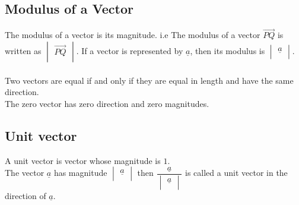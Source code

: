 \documentclass[11pt,a4paper]{article}
\begin{document}
\subsection{Modulus of a Vector}
The modulus of a vector is its magnitude. i.e The modulus of a  vector $\overrightarrow{PQ}$ is written as $\begin{vmatrix}
\overrightarrow{PQ}\\
\end{vmatrix}$. If a vector is represented by $\underline{a}$, then its modulus is $\begin{vmatrix}
\underline{a}\\
\end{vmatrix}$.\\\\



Two vectors are equal if and only if they are equal in length and have the same direction.\\

The zero vector has zero direction and zero magnitudes.

\begin{figure}[H]
\centering
{}
\end{figure}












\subsection{Unit vector}
A unit vector is vector whose magnitude is $1$.\\

The vector $\underline{a}$ has magnitude $\begin{vmatrix}
\underline{a}\\
\end{vmatrix}$ then $\dfrac{\underline{a}}{\begin{vmatrix}
\underline{a}\\
\end{vmatrix}}$ is called a unit vector in the direction of $\underline{a}$.\\\\
\end{document}
